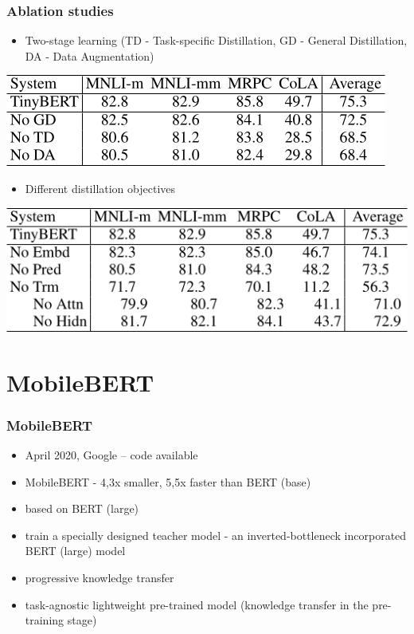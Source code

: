 \documentclass{beamer}
\begin{document}
\begin{frame}
    \frametitle{Ablation studies}
    \begin{itemize}
      \item Two-stage learning (TD - Task-specific Distillation, GD - General Distillation, DA - Data Augmentation)
    \end{itemize}
    \begin{center}
        \includegraphics[scale=0.38]{img/tiny_bert_ablation.png}
    \end{center}
    \begin{itemize}
      \item Different distillation objectives
    \end{itemize}
    \begin{center}
        \includegraphics[scale=0.35]{img/tiny_bert_ablation_2.png}
    \end{center}
\end{frame}




\section{MobileBERT}
\begin{frame}
    \frametitle{MobileBERT \cite{mobile_bert}}
    \begin{itemize}
        \item April 2020, Google -- code available
        \item MobileBERT - 4,3x smaller, 5,5x faster than BERT (base)
        \item based on BERT (large)
        \item train a specially designed teacher model - an inverted-bottleneck incorporated BERT (large) model
        \item progressive knowledge transfer
        \item task-agnostic lightweight pre-trained model (knowledge transfer in the pre-training stage)
    \end{itemize}
\end{frame}
\end{document}
